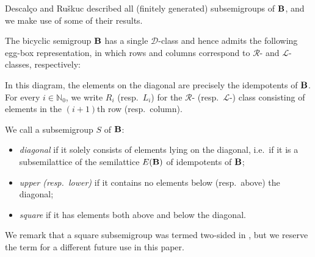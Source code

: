 \documentclass[reqno]{amsart}
\theoremstyle{plain}
\theoremstyle{definition}
\DeclareMathOperator{\B}{\textup{\textbf{B}}}
\newenvironment{bulletmidsentence}{\begin{itemize}[topsep=0mm, leftmargin=8mm, itemsep=1mm]
}{\end{itemize}}
\numberwithin{equation}{section}
\begin{document}
Descal\c{c}o and Ru\v{s}kuc \cite{DescalcoRuskuc2005, DescalcoRuskuc2008} described all (finitely generated) subsemigroups of $\B$, and we make use of some of their results. 


The bicyclic semigroup $\B$ has a single $\mathscr{D}$-class and hence admits the following egg-box representation, in which rows and columns correspond to $\mathscr{R}$- and $\mathscr{L}$-classes, respectively: 
\vspace{1mm}
{\begin{center}
\end{center}
}

In this diagram, the elements on the diagonal are precisely the idempotents of $\B$. 
For every $i\in \mathbb{N}_0$, we write $R_i$ (resp.\ $L_i$) for the $\mathscr{R}$- (resp.\ $\mathscr{L}$-) class consisting of elements in the $(i+1)$th row (resp.\ column).

We call a subsemigroup $S$ of $\B$: 
\begin{bulletmidsentence}
    \item \emph{diagonal} if it solely consists of elements lying on the diagonal, i.e.\ if it is a subsemilattice of the semilattice $E(\B)$ of idempotents of $\B$;
    \item \emph{upper (resp.\ lower)} if it contains no elements below (resp.\ above) the diagonal;
    \item \emph{square} if it has elements both above and below the diagonal.
\end{bulletmidsentence}
We remark that a square subsemigroup was termed two-sided in \cite{DescalcoRuskuc2005, DescalcoRuskuc2008}, but we reserve the term for a different future use in this paper.
\end{document}

